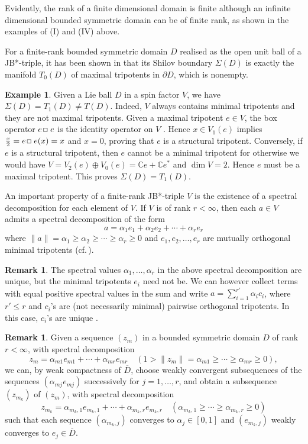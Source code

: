 \documentclass[12pt, twoside]{article}
\def\sqr#1#2{{\,\vcenter{\vbox{\hrule height.#2pt\hbox{\vrule width.#2pt
height#1pt \kern#1pt\vrule width.#2pt}\hrule height.#2pt}}\,}}
\def\bo{\sqr44\,}
\theoremstyle{definition}
\newtheorem{remark}[theorem]{Remark}
\newtheorem{example}[theorem]{Example}
\numberwithin{equation}{section}
\begin{document}
Evidently, the rank of a finite dimensional domain
is finite although an infinite dimensional bounded symmetric domain can be of finite rank,
as shown in the examples of (I) and (IV) above.

For a finite-rank bounded symmetric domain $D$ realised as the open unit ball of a JB*-triple, it has been shown
in \cite[Theorem 3.4.6]{book2} that its Shilov boundary $\Sigma(D)$ is exactly the manifold $T_0(D)$ of maximal tripotents
in $\partial D$, which is nonempty.

\begin{example}\label{sigma*}
 Given a Lie ball $D$ in a spin factor $V$, we have $\Sigma(D)=T_1(D) \neq T(D)$.
Indeed, $V$ always contains minimal tripotents and they are not maximal tripotents.
Given a maximal tripotent $e\in V$, the box operator $e \bo e$ is the identity operator on $V$
\cite[Lemma 2.5.4]{book2}.
Hence $x\in V_1(e)$ implies $\frac{x}{2} = e \bo e(x) =x$ and $x=0$, proving that $e$ is a structural tripotent.
Conversely, if $e$ is a structural tripotent, then $e$ cannot be a minimal tripotent for otherwise we would have
$V = V_2(e) \oplus V_0(e) = \mathbb{C}e + \mathbb{C}e^*$ and $\dim V =2$. Hence $e$ must be a maximal tripotent.
This proves $\Sigma(D)=T_1(D)$.
\end{example}

An important property of a finite-rank JB*-triple $V$ is the existence of a spectral decomposition for each
element of $V$. If $V$ is of rank $r<\infty$, then each $a\in V$ admits a spectral decomposition of the form
$$a = \alpha_1 e_1 + \alpha_2 e_2 + \cdots + \alpha_r e_r$$
where $\|a\|=\alpha_1 \geq \alpha_2 \geq \cdots \geq \alpha_r \geq 0$ and $e_1, e_2, \ldots, e_r$ are mutually
orthogonal minimal tripotents (cf.\,\cite[(3.32)]{book2}).

\begin{remark}\label{uni2}
The spectral values $\alpha_1, \ldots,  \alpha_r$ in the above spectral decomposition are unique, but the minimal tripotents $e_i$ need not be.
We can however collect terms with equal positive spectral values in the sum and write $a = \sum_{i=1}^{r'}\alpha_ic_i$, where $r'\leq r$ and  $c_i$'s are (not necessarily minimal) pairwise orthogonal tripotents. In this case,  $c_i$'s are unique  \cite[Theorem 1.2.34]{book}.
\end{remark}


\begin{remark}\label{sub}
Given a sequence $(z_m)$ in a  bounded symmetric domain $D$ of rank $r<\infty$, with spectral decomposition
$$z_m =  \alpha_{m1}e_{m1} + \cdots + \alpha_{mr}e_{mr} \quad (1>\|z_m\| = \alpha_{m1} \geq \cdots \geq \alpha_{mr}\geq 0),$$
we can, by weak compactness of $\overline D$, choose weakly convergent subsequences of the sequences
$( \alpha_{mj}e_{mj})$ successively for $j=1, \ldots, r$,  and obtain
a subsequence $(z_{m_k})$ of $(z_m)$, with spectral decomposition
$$z_{m_k} =  \alpha_{m_k,1}e_{m_k, 1} + \cdots + \alpha_{m_k, r}e_{m_k, r}
\quad (\alpha_{m_k,1} \geq \cdots \geq \alpha_{m_k,r}\geq 0)$$
such that each sequence $( \alpha_{m_k,j})$ converges to $\alpha_j \in [0,1]$ and $(e_{m_k, j})$
weakly converges to $e_j \in \overline D$.
\end{remark}
\end{document}
